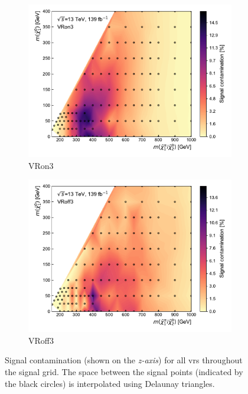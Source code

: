 \begin{figure}[H]
\begin{subfigure}[b]{0.5\linewidth}
		\centering\includegraphics[width=1.0\textwidth]{signal_contamination/plot_VRon3}
		\caption{VRon3\label{fig:signal_contaminations_VRon3}}
	\end{subfigure}\hfill
	\begin{subfigure}[b]{0.5\linewidth}
		\centering\includegraphics[width=1.0\textwidth]{signal_contamination/plot_VRoff3}
		\caption{VRoff3\label{fig:signal_contaminations_VRoff3}}
	\end{subfigure}\hfill

	\caption{Signal contamination (shown on the \textit{z-axis}) for all \glspl{vr} throughout the signal grid. The space between the signal points (indicated by the black circles) is interpolated using Delaunay triangles.}
	\label{fig:results_HF_scans}
\end{figure}
